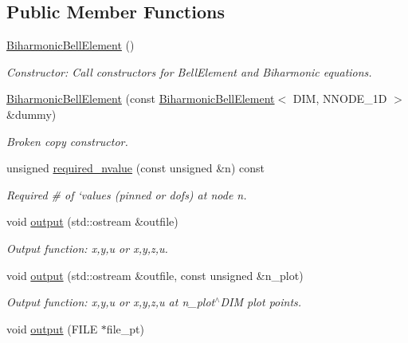 \subsection*{Public Member Functions}
\begin{DoxyCompactItemize}
\item 
\hyperlink{classoomph_1_1BiharmonicBellElement_a1b96f84a9a0c2a088b951c4dda757caf}{Biharmonic\+Bell\+Element} ()
\begin{DoxyCompactList}\small\item\em Constructor\+: Call constructors for Bell\+Element and Biharmonic equations. \end{DoxyCompactList}\item 
\hyperlink{classoomph_1_1BiharmonicBellElement_a3ecd6cdcd859d00650aa5426bf644d67}{Biharmonic\+Bell\+Element} (const \hyperlink{classoomph_1_1BiharmonicBellElement}{Biharmonic\+Bell\+Element}$<$ D\+IM, N\+N\+O\+D\+E\+\_\+1D $>$ \&dummy)
\begin{DoxyCompactList}\small\item\em Broken copy constructor. \end{DoxyCompactList}\item 
unsigned \hyperlink{classoomph_1_1BiharmonicBellElement_ad01e8642edd693134c4ca1960f267712}{required\+\_\+nvalue} (const unsigned \&n) const
\begin{DoxyCompactList}\small\item\em Required \# of `values\textquotesingle{} (pinned or dofs) at node n. \end{DoxyCompactList}\item 
void \hyperlink{classoomph_1_1BiharmonicBellElement_ac1b81d32000ddf336783005780a90e6c}{output} (std\+::ostream \&outfile)
\begin{DoxyCompactList}\small\item\em Output function\+: x,y,u or x,y,z,u. \end{DoxyCompactList}\item 
void \hyperlink{classoomph_1_1BiharmonicBellElement_a7c1a4a4a1743788bc1d557b0e4af51cf}{output} (std\+::ostream \&outfile, const unsigned \&n\+\_\+plot)
\begin{DoxyCompactList}\small\item\em Output function\+: x,y,u or x,y,z,u at n\+\_\+plot$^\wedge$\+D\+IM plot points. \end{DoxyCompactList}\item 
void \hyperlink{classoomph_1_1BiharmonicBellElement_a56802e7006ca17de8d4b980827e96569}{output} (F\+I\+LE $\ast$file\+\_\+pt)

\end{DoxyCompactItemize}
